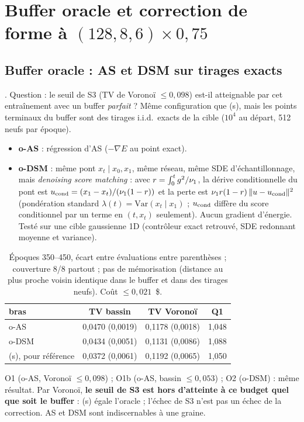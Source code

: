 \section{Buffer oracle et correction de forme à $(128,8,6)\times0{,}75$}
\label{sec:oracle}

\subsection{Buffer oracle : AS et DSM sur tirages exacts}
. Question : le seuil de S3 (TV de Voronoï $\le0{,}098$) est-il atteignable par cet entraînement avec un buffer \emph{parfait} ? Même configuration que (s), mais les points terminaux du buffer sont des tirages i.i.d.\ exacts de la cible ($10^4$ au départ, 512 neufs par époque).
\begin{itemize}
  \item \textbf{o-AS} : régression d'AS ($-\nabla E$ au point exact).
  \item \textbf{o-DSM} : même pont $x_t\mid x_0,x_1$, même réseau, même SDE d'échantillonnage, mais \emph{denoising score matching} : avec $r=\int_0^tg^2/\nu_{1}$, la dérive conditionnelle du pont est $u_{\rm cond}=(x_1-x_t)/(\nu_{1}(1-r))$ et la perte est $\nu_{1} r(1-r)\,\|u-u_{\rm cond}\|^2$ (pondération standard $\lambda(t)=\mathrm{Var}(x_t\mid x_1)$ ; $u_{\rm cond}$ diffère du score conditionnel par un terme en $(t,x_t)$ seulement). Aucun gradient d'énergie. Testé sur une cible gaussienne 1D (contrôleur exact retrouvé, SDE redonnant moyenne et variance).
\end{itemize}
\begin{table}[h]\centering\small
\begin{tabular}{lccc}\toprule
bras & TV bassin & TV Voronoï & Q1\\\midrule
o-AS & 0,0470 (0,0019) & 0,1178 (0,0018) & 1,048\\
o-DSM & 0,0434 (0,0051) & 0,1131 (0,0086) & 1,088\\
(s), pour référence & 0,0372 (0,0061) & 0,1192 (0,0065) & 1,050\\\bottomrule
\end{tabular}
\caption{Époques 350--450, écart entre évaluations entre parenthèses ; couverture 8/8 partout ; pas de mémorisation (distance au plus proche voisin identique dans le buffer et dans des tirages neufs). Coût $\le0{,}021$~\$.}
\end{table}
\begin{verdict}O1 (o-AS, Voronoï $\le0{,}098$) \faux{} ; O1b (o-AS, bassin $\le0{,}053$) \vrai{} ; O2 (o-DSM) : même résultat. Par Voronoï, \textbf{le seuil de S3 est hors d'atteinte à ce budget quel que soit le buffer} : (s) égale l'oracle ; l'échec de S3 n'est pas un échec de la correction. AS et DSM sont indiscernables à une graine.\end{verdict}

